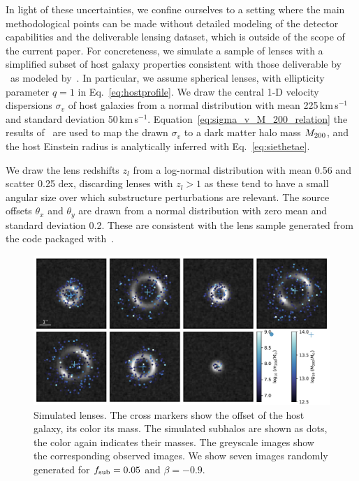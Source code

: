 \documentclass[twocolumn]{aastex62}
\begin{document}
In light of these uncertainties, we confine ourselves to a setting where the main methodological points can be made without detailed modeling of the detector capabilities and the deliverable lensing dataset, which is outside of the scope of the current paper. For concreteness, we simulate a sample of lenses with a simplified subset of host galaxy properties consistent with those deliverable by \Euclid~as modeled by~\citet{2015ApJ...811...20C}. In particular, we assume spherical lenses, with ellipticity parameter $q=1$ in Eq.~\ref{eq:hostprofile}. We draw the central 1-D velocity dispersions $\sigma_v$ of host galaxies from a normal distribution with mean 225\,km\,s$^{-1}$ and standard deviation 50\,km\,s$^{-1}$. Equation~\ref{eq:sigma_v_M_200_relation} the results of~\citet{2018ApJ...859...96Z} are used to map the drawn $\sigma_v$ to a dark matter halo mass $M_{200}$, and the host Einstein radius is analytically inferred with Eq.~\ref{eq:siethetae}.

We draw the lens redshifts $z_l$ from a log-normal distribution with mean 0.56 and scatter 0.25 dex, discarding lenses with $z_l > 1$ as these tend to have a small angular size over which substructure perturbations are relevant. The source offsets $\theta_x$ and $\theta_y$ are drawn from a normal distribution with zero mean and standard deviation 0.2. These are consistent with the lens sample generated from the  code packaged with~\citet{2015ApJ...811...20C}.

\begin{figure}
\centering
\includegraphics[width=1.\textwidth]{figures/simulations}
\caption{Simulated lenses. The cross markers show the offset of the host galaxy, its color its mass. The simulated subhalos are shown as dots, the color again indicates their masses. The greyscale images show the corresponding observed images. We show seven images randomly generated for $f_{\mathrm{sub}} = 0.05$ and $\beta = -0.9$.}
\label{fig:simulations}
\end{figure}
\end{document}

